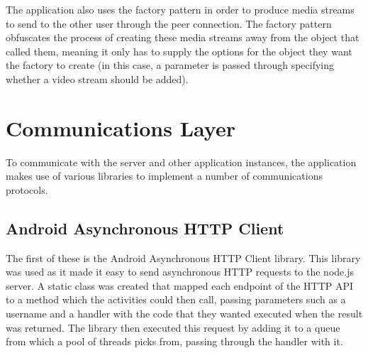 \documentclass[]{report}
\begin{document}
			The application also uses the factory pattern in order to produce media streams to send to the other user through the peer connection. The factory pattern obfuscates the process of creating these media streams away from the object that called them, meaning it only has to supply the options for the object they want the factory to create (in this case, a parameter is passed through specifying whether a video stream should be added).
			
		\section{Communications Layer}
		To communicate with the server and other application instances, the application makes use of various libraries to implement a number of communications protocols. 
		
			\subsection{Android Asynchronous HTTP Client}
			The first of these is the Android Asynchronous HTTP Client library. This library was used as it made it easy to send asynchronous HTTP requests to the node.js server. A static class was created that mapped each endpoint of the HTTP API to a method which the activities could then call, passing parameters such as a username and a handler with the code that they wanted executed when the result was returned. The library then executed this request by adding it to a queue from which a pool of threads picks from, passing through the handler with it.
	
\end{document}
